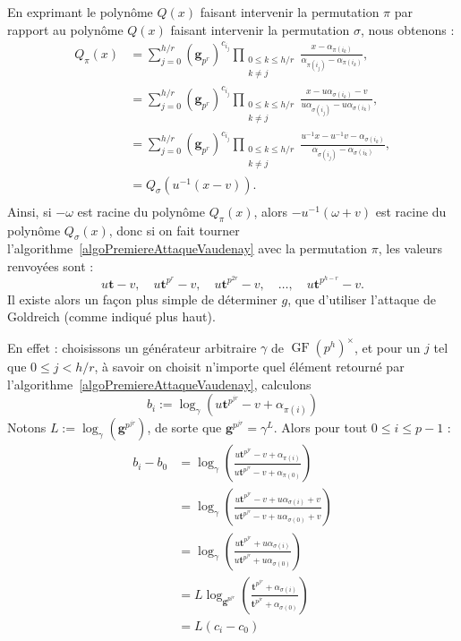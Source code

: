 \documentclass[a4paper, titlepage, 11pt]{article}
\theoremstyle{definition}
\theoremstyle{remark}
\def\gf{\operatorname{GF}}
\def\mbf#1{\mathbf{#1}}
\begin{document}
En exprimant le polynôme $Q(x)$ faisant intervenir la permutation $\pi$ par rapport au polynôme $Q(x)$ faisant intervenir la permutation $\sigma$, nous obtenons :
\begin{align*}
Q_\pi(x) &= \sum_{j=0}^{h/r} (\mbf g_{p^r})^{c_{i_j}} \prod_{\substack{0\leqslant k\leqslant h/r \\ k \neq j}}\frac{x-\alpha_{\pi(i_k)}}{\alpha_{\pi(i_j)}-\alpha_{\pi(i_k)}}, \\
&= \sum_{j=0}^{h/r} (\mbf g_{p^r})^{c_{i_j}} \prod_{\substack{0\leqslant k\leqslant h/r \\ k \neq j}}\frac{x-u\alpha_{\sigma(i_k)} - v}{u\alpha_{\sigma(i_j)}-u\alpha_{\sigma(i_k)}}, \\
&= \sum_{j=0}^{h/r} (\mbf g_{p^r})^{c_{i_j}} \prod_{\substack{0\leqslant k\leqslant h/r \\ k \neq j}}\frac{u^{-1}x - u^{-1}v-\alpha_{\sigma(i_k)}}{\alpha_{\sigma(i_j)}-\alpha_{\sigma(i_k)}}, \\
&= Q_\sigma(u^{-1}(x -v)). \\
\end{align*}
Ainsi, si $-\omega$ est racine du polynôme $Q_\pi(x)$, alors $-u^{-1}(\omega +v)$ est racine du polynôme $Q_\sigma(x)$, donc si on fait tourner l'algorithme~\ref{algoPremiereAttaqueVaudenay} avec la permutation $\pi$, les valeurs renvoyées sont :
$$u \mbf t -v,\quad u \mbf t^{p^r} -v,\quad u \mbf t^{p^{2r}} -v,\quad \dots,\quad u \mbf t^{p^{h - r}} -v.$$
Il existe alors un façon plus simple de déterminer $g$, que d'utiliser l'attaque de Goldreich (comme indiqué plus haut).

En effet : choisissons un générateur arbitraire $\gamma$ de $\gf(p^h)^\times$, et pour un $j$ tel que $0 \leqslant j < h/r$, à savoir on choisit n'importe quel élément retourné par l'algorithme~\ref{algoPremiereAttaqueVaudenay}, calculons $$b_i := \log_{\gamma}\left(u \mbf t^{p^{jr}} -v+\alpha_{\pi(i)}\right)$$
Notons $L := \log_{\gamma}(\mbf g^{p^{jr}})$, de sorte que $\mbf g^{p^{jr}}=\gamma^L$. Alors pour tout $0 \leqslant i \leqslant p-1$ :
\begin{align*}
b_i - b_0 &= \log_{\gamma}\left(\frac{u \mbf t^{p^{jr}} -v + \alpha_{\pi(i)}}{u \mbf t^{p^{jr}} -v + \alpha_{\pi(0)}}\right) \\
&= \log_{\gamma}\left(\frac{u \mbf t^{p^{jr}} -v + u \alpha_{\sigma(i)}+v}{u \mbf t^{p^{jr}} -v + u \alpha_{\sigma(0)}+v}\right)\\
&= \log_{\gamma}\left(\frac{u \mbf t^{p^{jr}} + u \alpha_{\sigma(i)}}{u \mbf t^{p^{jr}} + u \alpha_{\sigma(0)}}\right)\\
&= L\log_{\mbf g^{p^{jr}}}\left(\frac{\mbf t^{p^{jr}} + \alpha_{\sigma(i)}}{\mbf t^{p^{jr}} + \alpha_{\sigma(0)}}\right)\\
&= L(c_i - c_0) \\
\end{align*}
\end{document}
